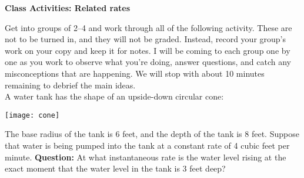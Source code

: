 \documentclass[11pt]{article}
\begin{document}
	
	\thispagestyle{empty}
	\renewcommand{\headrulewidth}{0.0pt}
	\thispagestyle{fancy}
	\lfoot{}
	\cfoot{}
	\rfoot{}	
	
	\vspace*{0in}

		\begin{center}
			\begin{large}
			\textbf{Class Activities: Related rates} \\
			\end{large}
		\end{center}
	
Get into groups of 2--4 and work through all of the following activity. These are not to be turned in, and they will not be graded. Instead, record your group's work on your copy and keep it for notes. I will be coming to each group one by one as you work to observe what you're doing, answer questions, and catch any misconceptions that are happening. We will stop with about 10 minutes remaining to debrief the main ideas.\\


A water tank has the shape of an upside-down circular cone:
\begin{center}
	\texttt{[image: cone]}
\end{center}
 The base radius of the tank is 6 feet, and the depth of the tank is 8 feet. Suppose that water is being pumped into the tank at a constant rate of 4 cubic feet per minute. \textbf{Question:} At what instantaneous rate is the water level rising at the exact moment that the water level in the tank is 3 feet deep? 
	
\end{document}
